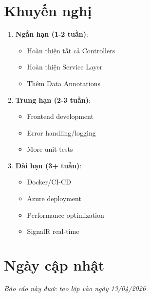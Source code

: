 \documentclass[12pt,a4paper]{report}
\begin{document}
\section{Khuyến nghị}
\begin{enumerate}
    \item \textbf{Ngắn hạn (1-2 tuần)}:
    \begin{itemize}
        \item Hoàn thiện tất cả Controllers
        \item Hoàn thiện Service Layer
        \item Thêm Data Annotations
    \end{itemize}
    
    \item \textbf{Trung hạn (2-3 tuần)}:
    \begin{itemize}
        \item Frontend development
        \item Error handling/logging
        \item More unit tests
    \end{itemize}
    
    \item \textbf{Dài hạn (3+ tuần)}:
    \begin{itemize}
        \item Docker/CI-CD
        \item Azure deployment
        \item Performance optimization
        \item SignalR real-time
    \end{itemize}
\end{enumerate}

\section{Ngày cập nhật}
\textit{Báo cáo này được tạo lập vào ngày 13/04/2026}
\end{document}
